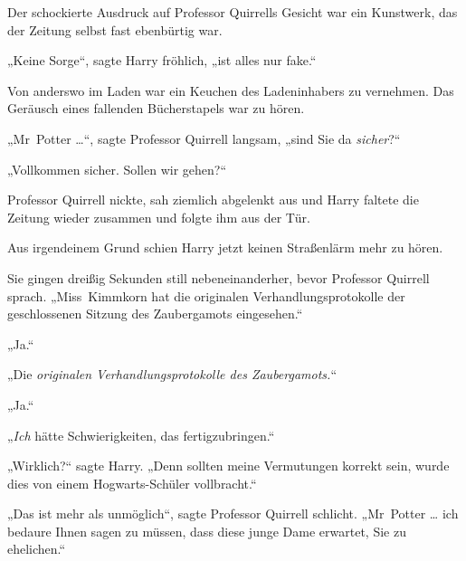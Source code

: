 Der schockierte Ausdruck auf Professor Quirrells Gesicht war ein Kunstwerk, das der Zeitung selbst fast ebenbürtig war.

„Keine Sorge“, sagte Harry fröhlich, „ist alles nur fake.“

Von anderswo im Laden war ein Keuchen des Ladeninhabers zu vernehmen. Das Geräusch eines fallenden Bücherstapels war zu hören.

„Mr~Potter …“, sagte Professor Quirrell langsam, „sind Sie da \emph{sicher}?“

„Vollkommen sicher. Sollen wir gehen?“

Professor Quirrell nickte, sah ziemlich abgelenkt aus und Harry faltete die Zeitung wieder zusammen und folgte ihm aus der Tür.

Aus irgendeinem Grund schien Harry jetzt keinen Straßenlärm mehr zu hören.

Sie gingen dreißig Sekunden still nebeneinanderher, bevor Professor Quirrell sprach.
„Miss~Kimmkorn hat die originalen Verhandlungsprotokolle der geschlossenen Sitzung des Zaubergamots eingesehen.“

„Ja.“

„Die \emph{originalen Verhandlungsprotokolle des Zaubergamots.}“

„Ja.“

„\emph{Ich} hätte Schwierigkeiten, das fertigzubringen.“

„Wirklich?“ sagte Harry.
„Denn sollten meine Vermutungen korrekt sein, wurde dies von einem Hogwarts-Schüler vollbracht.“

„Das ist mehr als unmöglich“, sagte Professor Quirrell schlicht.
„Mr~Potter … ich bedaure Ihnen sagen zu müssen, dass diese junge Dame erwartet, Sie zu ehelichen.“

